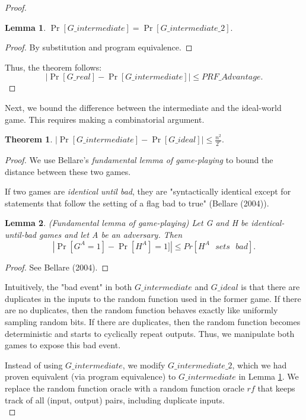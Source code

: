 \documentclass[12pt,lot, lof]{puthesis}
\newcommand{\s} {\textrm{ }}
\newcommand{\f}{\frac}
\newtheorem{thm}{Theorem}
\newtheorem{lem}{Lemma}[thm]
\begin{document}
{\begin{proof}
\begin{lem}\label{intermediate2} $\Pr[G\_intermediate] = \Pr[G\_intermediate\_2].$ \end{lem}
\begin{proof} By substitution and program equivalence.  \end{proof}

Thus, the theorem follows:
$$|\Pr[G\_real] - \Pr[G\_intermediate]| \leq PRF\_Advantage.$$ \end{proof}

Next, we bound the difference between the intermediate and the ideal-world game. This requires making a combinatorial argument.

\begin{thm} $| \Pr[G\_intermediate] - \Pr[G\_ideal]| \leq \f{n^2}{2^c}. $ \end{thm}
\begin{proof} 

We use Bellare's \emph{fundamental lemma of game-playing} to bound the distance between these two games.

If two games are \emph{identical until bad}, they are "syntactically identical except for statements that follow the setting of a flag bad to true" (Bellare (2004)).

\begin{lem}(Fundamental lemma of game-playing) Let G and H be identical-until-bad games and
let A be an adversary. Then 
$$|\Pr[G^A = 1] - \Pr[H^A] = 1]| \leq Pr[H^A \s sets \s bad].$$ \end{lem} 
\begin{proof} See Bellare (2004). \end{proof}

Intuitively, the "bad event" in both $G\_intermediate$ and $G\_ideal$ is that there are duplicates in the inputs to the random function used in the former game. If there are no duplicates, then the random function behaves exactly like uniformly sampling random bits. If there are duplicates, then the random function becomes deterministic and starts to cyclically repeat outputs. Thus, we manipulate both games to expose this bad event.

Instead of using $G\_intermediate$, we modify $G\_intermediate\_2$, which we had proven equivalent (via program equivalence) to $G\_intermediate$ in Lemma \ref{intermediate2}. We replace the random function oracle with a random function oracle $rf$ that keeps track of all (input, output) pairs, including duplicate inputs. \\


\end{proof}}
\end{document}
